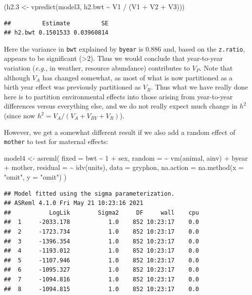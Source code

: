 \documentclass[
  12pt,
]{book}
\newenvironment{Shaded}{\begin{snugshade}}{\end{snugshade}}
\newcommand{\AttributeTok}[1]{\textcolor[rgb]{0.77,0.63,0.00}{#1}}
\newcommand{\DecValTok}[1]{\textcolor[rgb]{0.00,0.00,0.81}{#1}}
\newcommand{\FloatTok}[1]{\textcolor[rgb]{0.00,0.00,0.81}{#1}}
\newcommand{\FunctionTok}[1]{\textcolor[rgb]{0.00,0.00,0.00}{#1}}
\newcommand{\NormalTok}[1]{#1}
\newcommand{\OtherTok}[1]{\textcolor[rgb]{0.56,0.35,0.01}{#1}}
\newcommand{\SpecialCharTok}[1]{\textcolor[rgb]{0.00,0.00,0.00}{#1}}
\newcommand{\StringTok}[1]{\textcolor[rgb]{0.31,0.60,0.02}{#1}}
\begin{document}
\begin{Shaded}
\begin{Highlighting}[]
\NormalTok{(h2}\FloatTok{.3} \OtherTok{\textless{}{-}} \FunctionTok{vpredict}\NormalTok{(model3, h2.bwt }\SpecialCharTok{\textasciitilde{}}\NormalTok{ V1 }\SpecialCharTok{/}\NormalTok{ (V1 }\SpecialCharTok{+}\NormalTok{ V2 }\SpecialCharTok{+}\NormalTok{ V3)))}
\end{Highlighting}
\end{Shaded}

\begin{verbatim}
##         Estimate         SE
## h2.bwt 0.1501533 0.03960814
\end{verbatim}

Here the variance in \texttt{bwt} explained by \texttt{byear} is 0.886 and, based on the \texttt{z.ratio}, appears to be significant (\textgreater2). Thus we would conclude that year-to-year variation (\emph{e.g.}, in weather, resource abundance) contributes to \(V_P\). Note that although \(V_A\) has changed somewhat, as most of what is now partitioned as a birth year effect was previously partitioned as \(V_R\). Thus what we have really done here is to partition environmental effects into those arising from year-to-year differences versus everything else, and we do not really expect much change in \(h^2\) (since now \(h^2 = V_A/ (V_A+V_{BY}+V_R)\)).

However, we get a somewhat different result if we also add a random effect of \texttt{mother} to test for maternal effects:

\begin{Shaded}
\begin{Highlighting}[]
\NormalTok{model4 }\OtherTok{\textless{}{-}} \FunctionTok{asreml}\NormalTok{(}
  \AttributeTok{fixed =}\NormalTok{ bwt }\SpecialCharTok{\textasciitilde{}} \DecValTok{1} \SpecialCharTok{+}\NormalTok{ sex,}
  \AttributeTok{random =} \SpecialCharTok{\textasciitilde{}} \FunctionTok{vm}\NormalTok{(animal, ainv) }\SpecialCharTok{+}\NormalTok{ byear }\SpecialCharTok{+}\NormalTok{ mother,}
  \AttributeTok{residual =} \SpecialCharTok{\textasciitilde{}} \FunctionTok{idv}\NormalTok{(units),}
  \AttributeTok{data =}\NormalTok{ gryphon,}
  \AttributeTok{na.action =} \FunctionTok{na.method}\NormalTok{(}\AttributeTok{x =} \StringTok{"omit"}\NormalTok{, }\AttributeTok{y =} \StringTok{"omit"}\NormalTok{)}
\NormalTok{)}
\end{Highlighting}
\end{Shaded}

\begin{verbatim}
## Model fitted using the sigma parameterization.
## ASReml 4.1.0 Fri May 21 10:23:16 2021
##           LogLik        Sigma2     DF     wall    cpu
##  1     -2033.178           1.0    852 10:23:17    0.0
##  2     -1723.734           1.0    852 10:23:17    0.0
##  3     -1396.354           1.0    852 10:23:17    0.0
##  4     -1193.012           1.0    852 10:23:17    0.0
##  5     -1107.946           1.0    852 10:23:17    0.0
##  6     -1095.327           1.0    852 10:23:17    0.0
##  7     -1094.816           1.0    852 10:23:17    0.0
##  8     -1094.815           1.0    852 10:23:17    0.0
\end{verbatim}
\end{document}
